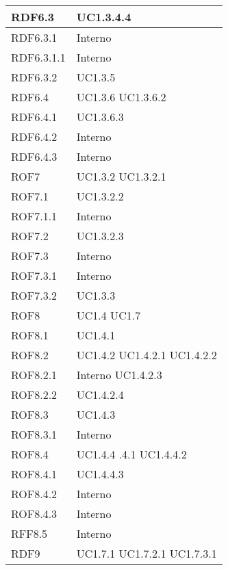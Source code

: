 \begin{center}
\begin{longtable}{| p{4cm} | p{4cm} |}
		\hline
		RDF6.3  &  UC1.3.4.4 \\
		\hline
		RDF6.3.1  &  Interno \\
		\hline
		RDF6.3.1.1  &  Interno \\
		\hline
		RDF6.3.2  &  UC1.3.5 \\
		\hline
		RDF6.4  &  UC1.3.6 \newline UC1.3.6.2 \\
		\hline
		RDF6.4.1  &  UC1.3.6.3 \\
		\hline
		RDF6.4.2  &  Interno \\
		\hline
		RDF6.4.3  &  Interno \\
		\hline
		ROF7  &  UC1.3.2 \newline UC1.3.2.1 \\
		\hline
		ROF7.1  &  UC1.3.2.2 \\
		\hline
		ROF7.1.1  &  Interno \\
		\hline
		ROF7.2  &  UC1.3.2.3 \\
		\hline
		ROF7.3  &  Interno \\
		\hline
		ROF7.3.1  &  Interno \\
		\hline
		ROF7.3.2  &  UC1.3.3 \\
		\hline
		ROF8  &  UC1.4 \newline UC1.7 \\
		\hline
		ROF8.1  &  UC1.4.1 \\
		\hline
		ROF8.2  &  UC1.4.2 \newline UC1.4.2.1 \newline UC1.4.2.2 \\
		\hline
		ROF8.2.1  &  Interno \newline UC1.4.2.3 \\
		\hline
		ROF8.2.2  &  UC1.4.2.4 \\
		\hline
		ROF8.3  &  UC1.4.3 \\
		\hline
		ROF8.3.1  &  Interno \\
		\hline
		ROF8.4  &  UC1.4.4 \newline 1.4.4.1 \newline UC1.4.4.2 \\
		\hline
		ROF8.4.1  &  UC1.4.4.3 \\
		\hline
		ROF8.4.2  &  Interno \\
		\hline
		ROF8.4.3  &  Interno \\
		\hline
		RFF8.5	&	Interno\\
		\hline
		RDF9  &  UC1.7.1 \newline UC1.7.2.1 \newline UC1.7.3.1 \\

\end{longtable}
\end{center}
